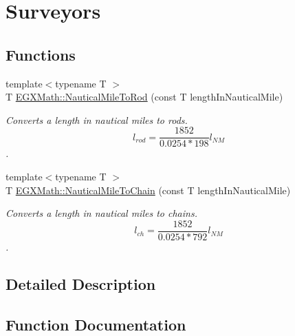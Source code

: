\hypertarget{group___e_g_x_math-_conversions-_length_conversions-_nautical-_nautical_mile-_surveyors}{}\section{Surveyors}
\label{group___e_g_x_math-_conversions-_length_conversions-_nautical-_nautical_mile-_surveyors}
\subsection*{Functions}
\begin{DoxyCompactItemize}
\item 
{\footnotesize template$<$typename T $>$ }\\T \mbox{\hyperlink{group___e_g_x_math-_conversions-_length_conversions-_nautical-_nautical_mile-_surveyors_gafcc747668b6e7d9a786bd74dc9c95c50}{E\+G\+X\+Math\+::\+Nautical\+Mile\+To\+Rod}} (const T length\+In\+Nautical\+Mile)
\begin{DoxyCompactList}\small\item\em Converts a length in nautical miles to rods. \[ l_{rod}= \frac{1852}{0.0254 * 198} l_{NM} \]. \end{DoxyCompactList}\item 
{\footnotesize template$<$typename T $>$ }\\T \mbox{\hyperlink{group___e_g_x_math-_conversions-_length_conversions-_nautical-_nautical_mile-_surveyors_ga22c96aeb0650b63698c2513a60f81456}{E\+G\+X\+Math\+::\+Nautical\+Mile\+To\+Chain}} (const T length\+In\+Nautical\+Mile)
\begin{DoxyCompactList}\small\item\em Converts a length in nautical miles to chains. \[ l_{ch}= \frac{1852}{0.0254 * 792} l_{NM} \]. \end{DoxyCompactList}\end{DoxyCompactItemize}


\subsection{Detailed Description}


\subsection{Function Documentation}
\mbox{\label{group___e_g_x_math-_conversions-_length_conversions-_nautical-_nautical_mile-_surveyors_ga22c96aeb0650b63698c2513a60f81456}} 
